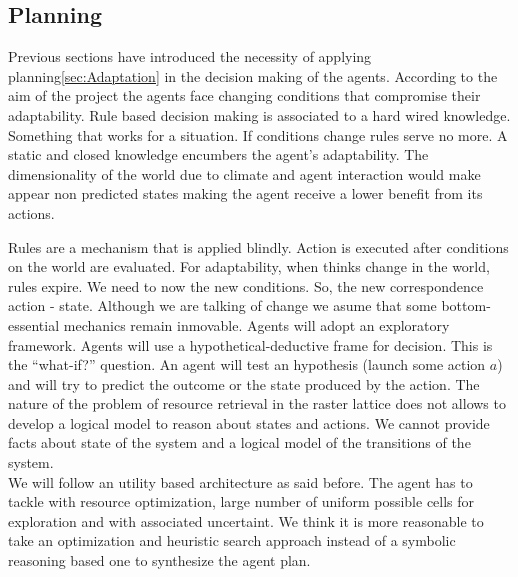 \documentclass[11pt,oneside,a4paper,openright]{report}
\begin{document}
\subsection{Planning}

Previous sections have introduced the necessity of applying planning\ref{sec:Adaptation} in the decision 
making of the agents. According to the aim of the project the agents face changing conditions that compromise their adaptability. Rule based decision making is associated to a hard wired knowledge. Something that works for a situation.
If conditions change rules serve no more. A static and closed knowledge encumbers the agent's adaptability.
The dimensionality of the world due to climate and agent interaction would make appear non predicted states
making the agent receive a lower benefit from its actions.

Rules are a mechanism that is applied blindly. Action is executed after conditions on the world are evaluated.
For adaptability, when thinks change in the world, rules expire. We need to now the new conditions. So, the 
new correspondence action - state. Although we are talking of change we asume that some bottom-essential mechanics remain inmovable. Agents will adopt an exploratory framework. Agents will use a hypothetical-deductive frame for decision. This is the ``what-if?'' question. An agent will test an hypothesis (launch some action $a$) and will
try to predict the outcome or the state produced by the action. The nature of the problem of resource retrieval in the raster lattice does not allows to develop a logical model to reason about states and actions. We cannot provide facts about state of the system and a logical model of the transitions of the system.\\
We will follow an utility based architecture as said before. The agent has to tackle with resource optimization, large number of uniform possible cells for exploration and with associated uncertaint. We think it is more reasonable to take an optimization and heuristic search approach instead of a symbolic reasoning based one to synthesize the agent plan.
\end{document}
